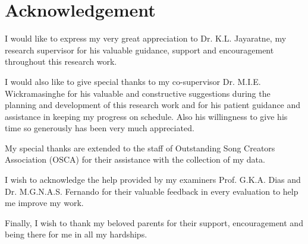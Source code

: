 \chapter*{Acknowledgement}

I would like to express my very great appreciation to Dr. K.L. Jayaratne, my research supervisor for his valuable guidance, 
support and encouragement throughout this research work.
\vspace{12pt}

I would also like to give special thanks to my co-supervisor Dr. M.I.E. Wickramasinghe for his valuable and constructive 
suggestions during the planning and development of this research work and for his patient guidance and assistance in keeping 
my progress on schedule. Also his willingness to give his time so generously has been very much appreciated.
\vspace{12pt}

My special thanks are extended to the staff of Outstanding Song Creators Association (OSCA) for their assistance with the 
collection of my data.
\vspace{12pt}

I wish to acknowledge the help provided by my examiners Prof. G.K.A. Dias and Dr. M.G.N.A.S. Fernando for their valuable 
feedback in every evaluation to help me improve my work.
\vspace{12pt}

Finally, I wish to thank my beloved parents for their support, encouragement and being there for me in all my hardships. 

